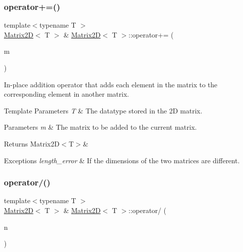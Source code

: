 \subsubsection{\texorpdfstring{operator+=()}{operator+=()}}
{\footnotesize\ttfamily template$<$typename T $>$ \\
\mbox{\hyperlink{classMatrix2D}{Matrix2D}}$<$ T $>$ \& \mbox{\hyperlink{classMatrix2D}{Matrix2D}}$<$ T $>$\+::operator+= (\begin{DoxyParamCaption}\item[{const \mbox{\hyperlink{classMatrix2D}{Matrix2D}}$<$ T $>$ \&}]{m }\end{DoxyParamCaption})}



In-\/place addition operator that adds each element in the matrix to the corresponding element in another matrix. 


\begin{DoxyTemplParams}{Template Parameters}
{\em T} & The datatype stored in the 2D matrix.\\
\hline
\end{DoxyTemplParams}

\begin{DoxyParams}{Parameters}
{\em m} & The matrix to be added to the current matrix. \\
\hline
\end{DoxyParams}
\begin{DoxyReturn}{Returns}
Matrix2\+D$<$\+T$>$\&
\end{DoxyReturn}

\begin{DoxyExceptions}{Exceptions}
{\em length\+\_\+error} & If the dimensions of the two matrices are different. \\
\hline
\end{DoxyExceptions}
\mbox{\label{classMatrix2D_a48122f2fa79bf511d0c4e143dcdb0cf0}} 
\subsubsection{\texorpdfstring{operator/()}{operator/()}}
{\footnotesize\ttfamily template$<$typename T $>$ \\
\mbox{\hyperlink{classMatrix2D}{Matrix2D}}$<$ T $>$ \& \mbox{\hyperlink{classMatrix2D}{Matrix2D}}$<$ T $>$\+::operator/ (\begin{DoxyParamCaption}\item[{const double}]{n }\end{DoxyParamCaption})}



